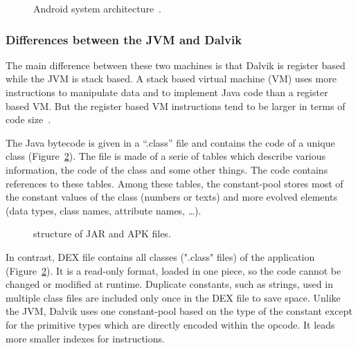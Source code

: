 \documentclass{sig-alternate}
\def \DALVIK{Dalvik\xspace}
\def \ANDROID{Android\xspace}
\def \JVM{JVM\xspace}
\def \DEX{DEX\xspace}
\begin{document}
    \begin{figure}[!ht]
      \centering \resizebox{\linewidth}{!}{}
      \caption{\ANDROID system architecture~\cite{wiki-android}.}\vspace{-1em}
      \label{ASA}
    \end{figure}

    \subsubsection{Differences between the JVM and \DALVIK}

      The main difference between these two machines is that \DALVIK is register based while the \JVM is stack based.
      A stack based virtual machine (VM) uses more instructions to manipulate data and to implement Java code than a register based VM.
      But the register based VM instructions tend to be larger in terms of code size~\cite{ieee-paul-kundu-energy-perspective}.

      The Java bytecode is given in a ``.class'' file and contains the code of a unique class (Figure~\ref{SJA}).
      The file is made of a serie of tables which describe various information, the code of the class and some other things.
      The code contains references to these tables.
      Among these tables, the constant-pool stores most of the constant values of the class (numbers or texts)
      and more evolved elements (data types, class names, attribute names, \dots).

      \begin{figure}[!ht]
        \centering \resizebox{\linewidth}{!}{}
        \caption{structure of JAR and APK files.}\vspace{-.5em}
        \label{SJA}
      \end{figure}

      In contrast, \DEX file contains all classes (".class" files) of the application (Figure~\ref{SJA}).
      It is a read-only format, loaded in one piece, so the code cannot be changed or modified at runtime.
      Duplicate constants, such as strings, used in multiple class files
      are included only once in the \DEX file to save space.
      Unlike the \JVM, \DALVIK uses one constant-pool based on the type of the constant
      except for the primitive types which are directly encoded within the opcode.
      It leads more smaller indexes for instructions.\\
\end{document}
